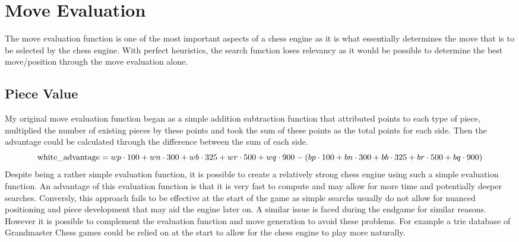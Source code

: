 \chapter{Move Evaluation}
The move evaluation function is one of the most important aspects of a chess engine as it is what essentially determines the move that is to be selected by the chess engine. With perfect heuristics, the search function loses relevancy as it would be possible to determine the best move/position through the move evaluation alone.
\section{Piece Value}
My original move evaluation function began as a simple addition subtraction function that attributed points to each type of piece, multiplied the number of existing pieces by these points and took the sum of these points as the total points for each side. Then the advantage could be calculated through the difference between the sum of each side. \[
\text{white\_advantage} = wp \cdot 100 + wn \cdot 300 + wb \cdot 325 + wr \cdot 500 + wq \cdot 900 \\
- (bp \cdot 100 + bn \cdot 300 + bb \cdot 325 + br \cdot 500 + bq \cdot 900)
\]
Despite being a rather simple evaluation function, it is possible to create a relatively strong chess engine using such a simple evaluation function. An advantage of this evaluation function is that it is very fast to compute and may allow for more time and potentially deeper searches. Conversly, this approach fails to be effective at the start of the game as simple searchs usually do not allow for nuanced positioning and piece development that may aid the engine later on. A similar issue is faced during the endgame for similar reasons. However it is possible to complement the evaluation function and move generation to avoid these problems. For example a trie database of Grandmaster Chess games could be relied on at the start to allow for the chess engine to play more naturally.
